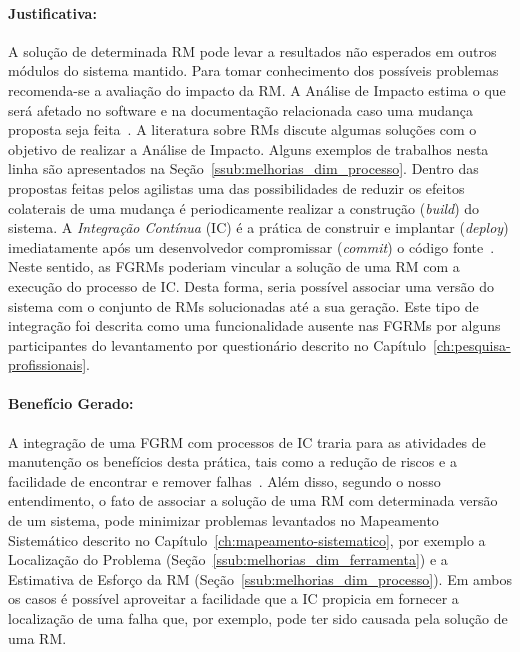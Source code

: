 
\paragraph{Justificativa:}
\label{par:justificativa_s05}

A solução de determinada RM pode levar a resultados não esperados em outros
módulos do sistema mantido. Para tomar conhecimento dos possíveis problemas
recomenda-se a avaliação do impacto da RM\@. A Análise de Impacto estima o que
será afetado no software e na documentação relacionada caso uma mudança proposta
seja feita~\cite{arnold1996software}. A literatura sobre RMs discute algumas
soluções com o objetivo de realizar a Análise de Impacto. Alguns exemplos de
trabalhos nesta linha são apresentados na
Seção~\ref{ssub:melhorias_dim_processo}. Dentro das propostas feitas pelos
agilistas uma das possibilidades de reduzir os efeitos colaterais de uma mudança
é periodicamente realizar a construção (\textit{build}) do sistema. A
\textit{Integração Contínua} (IC) é a prática de construir e implantar
(\textit{deploy}) imediatamente após um desenvolvedor compromissar
(\textit{commit}) o código fonte~\cite{aiello2010configuration}. Neste sentido,
as FGRMs poderiam vincular a solução de uma RM com a execução do processo de
IC\@. Desta forma, seria possível associar uma versão do sistema com o conjunto
de RMs solucionadas até a sua geração. Este tipo de integração foi descrita
como uma funcionalidade ausente nas FGRMs por alguns participantes do
levantamento por questionário descrito no
Capítulo~\ref{ch:pesquisa-profissionais}.

\paragraph{Benefício Gerado:}
\label{par:papéis_afetados_s05}

A integração de uma FGRM com processos de IC traria para as atividades de
manutenção os benefícios desta prática, tais como a redução de riscos e a
facilidade de encontrar e remover falhas~\cite{fowler2006continuous}.  Além
disso, segundo o nosso entendimento, o fato de associar a solução de uma RM com
determinada versão de um sistema, pode minimizar problemas levantados no
Mapeamento Sistemático descrito no Capítulo~\ref{ch:mapeamento-sistematico}, por
exemplo a Localização do Problema (Seção~\ref{ssub:melhorias_dim_ferramenta}) e
a Estimativa de Esforço da RM (Seção~\ref{ssub:melhorias_dim_processo}). Em
ambos os casos é possível aproveitar a facilidade que a IC propicia em fornecer
a localização de uma falha que, por exemplo, pode ter sido causada pela solução
de uma RM\@.

